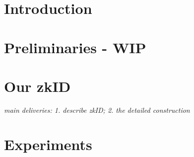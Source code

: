 \documentclass{iacrtrans}
\newcommand{\ndhy}[2]{{\color{blue}{}ndhy: #2}}
\begin{document}


\section{Introduction}
\label{sec:introduction}


\section{Preliminaries - WIP}
\label{sec:preliminaries}

\section{Our zkID}
\label{sec:contribution}
\textit{main deliveries: 1. describe zkID; 2. the detailed construction}



\section{Experiments}
\label{sec:experiments}

\end{document}
